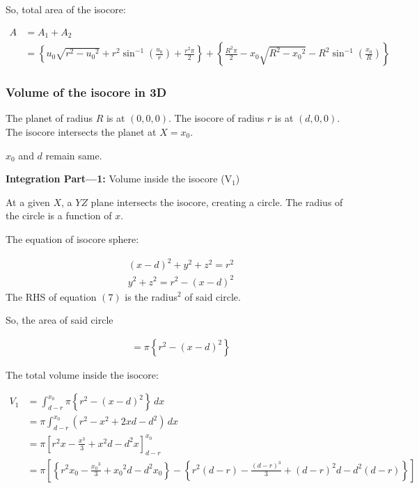 \documentclass[12pt]{extarticle}
\begin{document}
So, total area of the isocore:

    \begin{align*} 
     A &= A_1 + A_2 \\
     &= \left\{ u_0 \sqrt{r^2 - {u_0}^2} + r^2 \sin^{-1} \left(   \frac{u_0}{r}   \right) + \frac{r^2 \pi}{2} \right\} + 
        \left\{  \frac{R^2 \pi}{2} - x_0 \sqrt{R^2 - {x_0}^2} - R^2 \sin^{-1}{\left( \frac{x_0}{R} \right)}  \right\}
    \end{align*}



\vspace{0.5cm}










\subsubsection{Volume of the isocore in 3D}


The planet of radius $R$ is at $(0,0,0)$. The isocore of radius $r$ is at $(d,0,0)$. The isocore intersects the planet at $X=x_0$.

$x_0$ and $d$ remain same. 


\textbf{Integration Part---1:} Volume inside the isocore (V$_1$)

At a given $X$, a $YZ$ plane intersects the isocore, creating a circle. The radius of the circle is a function of $x$.

The equation of isocore sphere:

    \begin{align*} 
        (x-d)^2 + y^2 + z^2 = r^2 \\
        y^2 + z^2 = r^2 - (x-d)^2 \tag{7}
    \end{align*}
The RHS of equation $(7)$ is the radius$^2$ of said circle.

So, the area of said circle

    \begin{align*} 
        = \pi \left\{r^2 - (x-d)^2\right\}
    \end{align*}


The total volume inside the isocore:
        
    \begin{align*} 
        V_1 &= \int_{d-r}^{x_0}  \pi \left\{r^2 - (x-d)^2\right\}  \,dx \\
        &= \pi \int_{d-r}^{x_0} (r^2 - x^2 + 2xd - d^2) \,dx \\
        &= \pi \left[  r^2 x - \frac{x^3}{3} + x^2d -d^2x   \right]_{d-r}^{x_0} \\
        &= \pi \left[ \left\{ r^2 x_0 - \frac{{x_0}^3}{3} + {x_0}^2d -d^2x_0 \right\} -   \left\{ r^2 (d-r) - \frac{(d-r)^3}{3} + (d-r)^2 d - d^2 (d-r) \right\}   \right]
    \end{align*}
\end{document}
